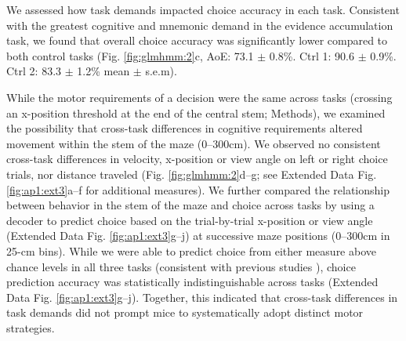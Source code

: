 We assessed how task demands impacted choice accuracy in each task. Consistent with the greatest cognitive and mnemonic demand in the evidence accumulation task, we found that overall choice accuracy was significantly lower compared to both control tasks (Fig. \ref{fig:glmhmm:2}c, AoE: 73.1 $\pm$ 0.8\%. Ctrl 1: 90.6 $\pm$ 0.9\%. Ctrl 2: 83.3 $\pm$ 1.2\% mean $\pm$ s.e.m).

While the motor requirements of a decision were the same across tasks (crossing an x-position threshold at the end of the central stem; Methods), we examined the possibility that cross-task differences in cognitive requirements altered movement within the stem of the maze (0–300cm). We observed no consistent cross-task differences in velocity, x-position or view angle on left or right choice trials, nor distance traveled (Fig. \ref{fig:glmhmm:2}d–g; see Extended Data Fig. \ref{fig:ap1:ext3}a–f for additional measures). We further compared the relationship between behavior in the stem of the maze and choice across tasks by using a decoder to predict choice based on the trial-by-trial x-position or view angle (Extended Data Fig. \ref{fig:ap1:ext3}g–j) at successive maze positions (0–300cm in 25-cm bins). While we were able to predict choice from either measure above chance levels in all three tasks (consistent with previous studies \cite{pinto_accumulation--evidence_2018}), choice prediction accuracy was statistically indistinguishable across tasks (Extended Data Fig. \ref{fig:ap1:ext3}g–j). Together, this indicated that cross-task differences in task demands did not prompt mice to systematically adopt distinct motor strategies.